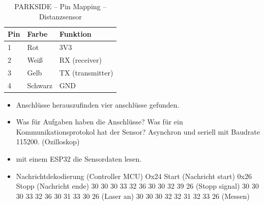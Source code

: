 \begin{table}[ht]
	\centering
	\caption{PARKSIDE – Pin Mapping – Distanzsensor}
	\label{parkside:pinmapping}
	\begin{tabular}{l|ll}
		\hline
		\textbf{Pin} & \textbf{Farbe} & \textbf{Funktion} \\ \hline
		1            & Rot            & 3V3               \\
		2            & Weiß           & RX (receiver)     \\
		3            & Gelb           & TX (transmitter)  \\
		4            & Schwarz        & GND               \\ \hline
	\end{tabular}
\end{table}




\begin{itemize}
	\item Anschlüsse herauszufinden vier anschlüsse gefunden.
	\item Was für Aufgaben haben die Anschlüsse?
	      \subitem Was für ein Kommunikationsprotokol hat der Sensor?
	      \subitem Asynchron und seriell mit Baudrate 115200. (Ozilloskop)
	\item mit einem ESP32 die Sensordaten lesen.
	\item Nachrichtdekodierung (Controller MCU)
	      \subitem Ox24 Start (Nachricht start)
	      \subitem 0x26 Stopp (Nachricht ende)
	       30 30 30 33 32 36 30 30 32 39 26 (Stopp signal)
	       30 30 30 33 32 36 30 31 33 30 26 (Laser an)
	       30 30 30 32 32 31 32 33 26 (Messen)
\end{itemize}


